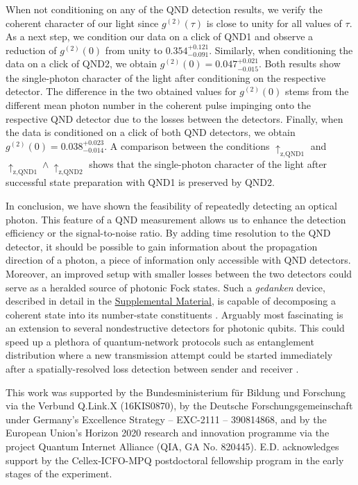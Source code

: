 \documentclass[prl,amsmath,amssymb,bibnotes,aps,longbibliography,12pt]{revtex4-1}
\begin{document}
When not conditioning on any of the QND detection results, we verify the coherent character of our light since $g^{(2)}(\tau)$ is close to unity for all values of $\tau$. As a next step, we condition our data on a click of QND1 and observe a reduction of $g^{(2)}(0)$ from unity to $0.354^{+0.121}_{-0.091}$. Similarly, when conditioning the data on a click of QND2, we obtain $g^{(2)}(0)=0.047^{+0.021}_{-0.015}$. Both results show the single-photon character of the light after conditioning on the respective detector. The difference in the two obtained values for $g^{(2)}(0)$ stems from the different mean photon number in the coherent pulse impinging onto the respective QND detector due to the losses between the detectors. Finally, when the data is conditioned on a click of both QND detectors, we obtain $g^{(2)}(0)=0.038^{+0.023}_{-0.014}$. A comparison between the conditions $\uparrow_{\text{z,QND1}}$ and $\uparrow_{\text{z,QND1}}\land\uparrow_{\text{z,QND2}}$ shows that the single-photon character of the light after successful state preparation with QND1 is preserved by QND2. 

In conclusion, we have shown the feasibility of repeatedly detecting an optical photon. This feature of a QND measurement allows us to enhance the detection efficiency or the signal-to-noise ratio. By adding time resolution to the QND detector, it should be possible to gain information about the propagation direction of a photon, a piece of information only accessible with QND detectors. Moreover, an improved setup with smaller losses between the two detectors could serve as a heralded source of photonic Fock states. Such a \textit{gedanken} device, described in detail in the \hyperref[supplement]{Supplemental Material}, is capable of decomposing a coherent state into its number-state constituents \cite{guerlin2007}. Arguably most fascinating is an extension to several nondestructive detectors for photonic qubits. This could speed up a plethora of quantum-network \cite{kimble2008,reiserer2015,wehner2018} protocols such as entanglement distribution where a new transmission attempt could be started immediately after a spatially-resolved loss detection between sender and receiver \cite{niemietz2021}.
\begin{acknowledgments}
This work was supported by the Bundesministerium f\"{u}r Bildung und Forschung via the Verbund Q.Link.X (16KIS0870), by the Deutsche Forschungsgemeinschaft under Germany’s Excellence Strategy – EXC-2111 – 390814868, and by the European Union’s Horizon 2020 research and innovation programme via the project Quantum Internet Alliance (QIA, GA No. 820445). E.D. acknowledges support by the Cellex-ICFO-MPQ postdoctoral fellowship program in the early stages of the experiment.
\end{acknowledgments}
\end{document}

